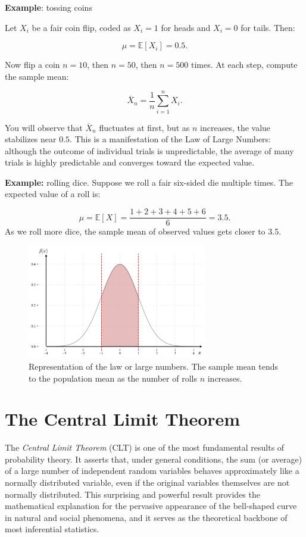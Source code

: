 \documentclass{book}
\begin{document}
\medskip

\textbf{Example}: tossing coins

Let \( X_i \) be a fair coin flip, coded as \( X_i = 1 \) for heads and \( X_i = 0 \) for tails. Then:

\[
	\mu = \mathbb{E}[X_i] = 0.5.
\]

Now flip a coin \( n = 10 \), then \( n = 50 \), then \( n = 500 \) times. At each step, compute the sample mean:

\[
	\overline{X}_n = \frac{1}{n} \sum_{i=1}^n X_i.
\]

You will observe that \( \overline{X}_n \) fluctuates at first, but as \( n \) increases, the value stabilizes near \( 0.5 \). This is a manifestation of the Law of Large Numbers: although the outcome of individual trials is unpredictable, the average of many trials is highly predictable and converges toward the expected value.

\textbf{Example:} rolling dice. Suppose we roll a fair six-sided die multiple times. The expected value of a roll is:

\[
    \mu = \mathbb{E}[X] = \frac{1+2+3+4+5+6}{6} = 3.5.
\]
As we roll more dice, the sample mean of observed values gets closer to 3.5. 

\begin{figure}[ht]
    \centering
    \includegraphics[width=0.7\textwidth]{figures/chapter2/gaussian_2.png}
    \caption{Representation of the law or large numbers. The sample mean tends to the population mean as the number of rolls $n$ increases.}
    \label{fig:random}
\end{figure}

\newpage

\section{The Central Limit Theorem}

The \textit{Central Limit Theorem} (CLT) is one of the most fundamental results of probability theory. It asserts that, under general conditions, the sum (or average) of a large number of independent random variables behaves approximately like a normally distributed variable, even if the original variables themselves are not normally distributed. This surprising and powerful result provides the mathematical explanation for the pervasive appearance of the bell-shaped curve in natural and social phenomena, and it serves as the theoretical backbone of most inferential statistics.
\end{document}
